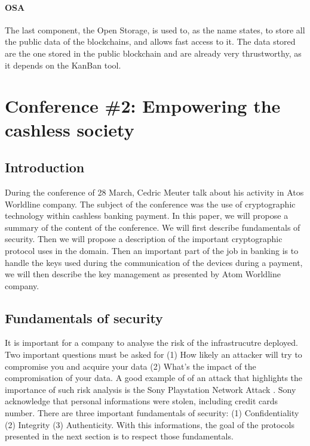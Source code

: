 \documentclass[11pt,a4paper]{article}
\begin{document}
\paragraph{OSA}

The last component, the Open Storage, is used to, as the name states, to
store all the public data of the blockchains, and allows fast access
to it. The data stored are the one stored in the public blockchain
and are already very thrustworthy, as it depends on the KanBan tool.

\newpage

\section{Conference \#2: Empowering the cashless society}

\subsection{Introduction}

During the conference of 28 March, Cedric Meuter
talk about his activity in Atos Worldline company.
The subject of the conference was the use of
cryptographic technology within cashless banking payment.
In this paper, we will propose a summary of the content of the
conference. We will first describe fundamentals of security.
Then we will propose a description of the important
cryptographic protocol uses in the domain. Then an important
part of the job in banking is to handle the keys used
during the communication of the devices during a payment,
we will then describe the key management as presented
by Atom Worldline company.

\subsection{Fundamentals of security}

It is important for a company to analyse the risk
of the infrastrucutre deployed. Two important questions must
be asked for (1) How likely an attacker will try to compromise
you and acquire your data (2) What's the impact of the compromisation
of your data. A good example of of an attack that highlights
the importance of such risk analysis is the Sony Playstation Network
Attack \cite{raiu_cyber-threat_2012}. Sony acknowledge that
personal informations were stolen, including credit cards number.
There are three important fundamentals of security:
(1) Confidentiality (2) Integrity (3) Authenticity.
With this informations, the goal of the protocols presented
in the next section is to respect those fundamentals.
\end{document}
